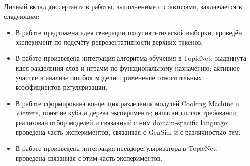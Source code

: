 {\contribution} Личный вклад диссертанта в работы, выполненные с
соавторами, заключается в следующем:
\begin{itemize}
    \item В работе \cite{intracoh} предложена идея генерации полусинтетической выборки, проведён эксперимент по подсчёту репрезентативности верхних токенов.
    \item В работе \cite{popov_hier} произведена интеграция алгоритма обучения в TopicNet; выдвинута идея разделения слов и нграмм по функциональному назначению; активное участие в анализе ошибок модели; применение относительных коэффициентов регуляризации,
    \item В работе \cite{bulatov2020topicnet} сформирована концепция разделения модулей Cooking Machine и Viewers, понятие куба и дерева эксперимента; написан список требований; реализован отбор моделей и связанный с ним domain-specific language; проведена часть экспериментов, связанная с GenSim и с различностью тем.
    \item В работе \cite{thetaless} произведена интеграция псевдорегуляризатора в TopicNet, проведена связанная с этим часть экспериментов.
\end{itemize}

